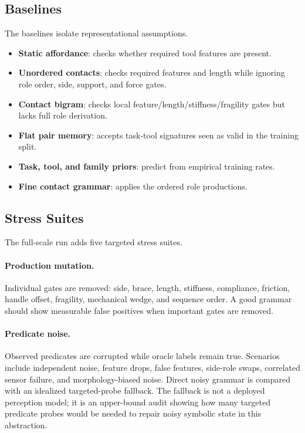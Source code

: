 \documentclass{article}
\begin{document}
\subsection{Baselines}

The baselines isolate representational assumptions.
\begin{itemize}
    \item \textbf{Static affordance}: checks whether required tool features are present.
    \item \textbf{Unordered contacts}: checks required features and length while ignoring role order, side, support, and force gates.
    \item \textbf{Contact bigram}: checks local feature/length/stiffness/fragility gates but lacks full role derivation.
    \item \textbf{Flat pair memory}: accepts task-tool signatures seen as valid in the training split.
    \item \textbf{Task, tool, and family priors}: predict from empirical training rates.
    \item \textbf{Fine contact grammar}: applies the ordered role productions.
\end{itemize}

\subsection{Stress Suites}

The full-scale run adds five targeted stress suites.

\paragraph{Production mutation.}
Individual gates are removed: side, brace, length, stiffness, compliance, friction, handle offset, fragility, mechanical wedge, and sequence order. A good grammar should show measurable false positives when important gates are removed.

\paragraph{Predicate noise.}
Observed predicates are corrupted while oracle labels remain true. Scenarios include independent noise, feature drops, false features, side-role swaps, correlated sensor failure, and morphology-biased noise. Direct noisy grammar is compared with an idealized targeted-probe fallback. The fallback is not a deployed perception model; it is an upper-bound audit showing how many targeted predicate probes would be needed to repair noisy symbolic state in this abstraction.
\end{document}
